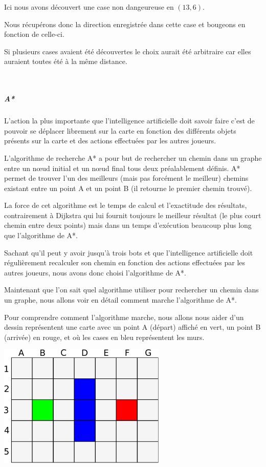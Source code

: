 			Ici nous avons découvert une case non dangeureuse en $(13,6)$.
			
			Nous récupérons donc la direction enregistrée dans cette case et bougeons en fonction de celle-ci.
			
			Si plusieurs cases avaient été découvertes le choix aurait été arbitraire car elles auraient toutes été à la même distance.
			
			$\,$
			
		\subparagraph{A*\\}
		
			L'action la plus importante que l'intelligence artificielle doit savoir faire c'est de pouvoir se déplacer librement sur la carte en fonction des différents objets présents sur la carte et des actions effectuées par les autres joueurs.
		
			L'algorithme de recherche A* a pour but de rechercher un chemin
			dans un graphe entre un nœud initial et un nœud final tous deux préalablement
			définis. A* permet de trouver l'un des meilleurs (mais pas forcément le
			meilleur) chemins existant entre un point A et un point B (il retourne le premier chemin trouvé).
			
			La force de cet algorithme est le temps de calcul et l'exactitude des résultats, contrairement à Dijkstra qui lui fournit toujours le meilleur résultat (le plus court chemin entre deux points) mais dans un temps d'exécution beaucoup plus long que l'algorithme de A*.
			
			Sachant qu'il peut y avoir jusqu'à trois \glspl{bot} et que l'intelligence artificielle doit régulièrement recalculer son chemin en fonction des actions effectuées par les autres joueurs, nous avons donc choisi l'algorithme de A*.
		
			Maintenant que l'on sait quel algorithme utiliser pour rechercher un chemin dans un graphe, nous allons voir en détail comment marche l'algorithme de A*.
		
			Pour comprendre comment l'algorithme marche, nous allons nous aider d'un
			dessin représentent une carte avec un point A (départ) affiché en vert, un
			point B (arrivée) en rouge, et où les cases en bleu représentent les murs.
		
			\begin{center}
				\includegraphics[width=8cm]{./Analyse/Img/Grille.eps}
			\end{center}
		
